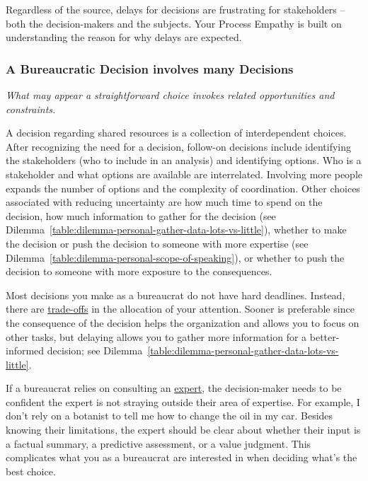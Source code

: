 Regardless of the source, delays for decisions are frustrating for stakeholders -- both the decision-makers and the subjects. Your Process Empathy is built on understanding the reason for why delays are expected.


\subsubsection*{A Bureaucratic Decision involves many Decisions}

\textit{What may appear a straightforward choice invokes related opportunities and constraints.}

A decision regarding shared resources is a collection of interdependent choices. After recognizing the need for a decision, follow-on decisions include identifying the stakeholders (who to include in an analysis) and identifying options. Who is a stakeholder and what options are available are interrelated. Involving more people expands the number of options and the complexity of coordination. Other choices associated with reducing uncertainty are how much time to spend on the decision, how much information to gather for the decision (see Dilemma~\ref{table:dilemma-personal-gather-data-lots-vs-little}),
%
whether to make the decision or push the decision to someone with more expertise (see Dilemma~\ref{table:dilemma-personal-scope-of-speaking}), or whether to push the decision to someone with more exposure to the consequences.

Most decisions you make as a bureaucrat do not have hard deadlines. Instead, there are \hyperref[sec:dilemma-trilemma]{trade-offs} in the allocation of your attention. Sooner is preferable since the consequence of the decision helps the organization and allows you to focus on other tasks, but delaying allows you to gather more information for a better-informed decision; see 
Dilemma~\ref{table:dilemma-personal-gather-data-lots-vs-little}.


If a bureaucrat relies on consulting an
\hyperref[sec:expertise]{expert},
%
the decision-maker needs to be confident the expert is not  straying outside their area of expertise. For example, I don't rely on a botanist  to tell me how to change the oil in my car. 
Besides knowing their limitations, the expert should be clear about whether their input is a factual summary, a predictive assessment, or a value judgment. This complicates what you as a bureaucrat are interested in when deciding what's the best choice.



